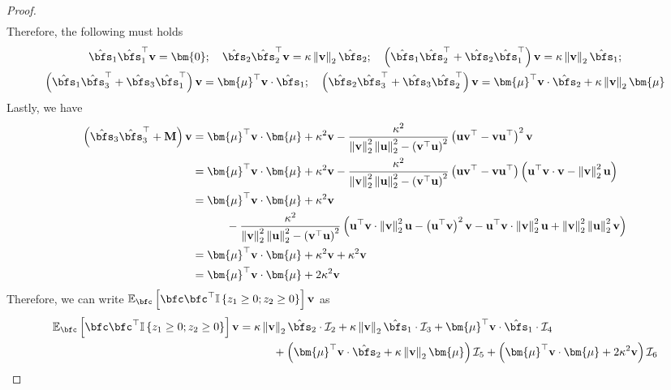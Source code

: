 \documentclass[10pt]{article} %
\theoremstyle{definition}
\theoremstyle{plain}
\newcommand{\paren}[1]{\left(#1\right)}
\newcommand{\norm}[1]{\left\|#1\right\|}
\newcommand{\indy}[1]{\mathbb{I}\left\{#1\right\}}
\providecommand{\E}{\mathbb{E}}
\def\bfM{{\mathbf{M}}}\def\bfN{{\mathbf{N}}}\def\bfO{{\mathbf{O}}}\def\bfP{{\mathbf{P}}}
\def\bfu{{\mathbf{u}}}\def\bfv{{\mathbf{v}}}\def\bfw{{\mathbf{w}}}\def\bfx{{\mathbf{x}}}
\begin{document}
\begin{proof}
\begin{align*}
    \end{align*}
    Therefore, the following must holds
    \begin{gather*}
        \hat{\bfs}_1\hat{\bfs}_1^\top\bfv = \bm{0};\quad \hat{\bfs}_2\hat{\bfs}_2^\top\bfv = \kappa\norm{\bfv}_2\hat{\bfs}_2;\quad \paren{\hat{\bfs}_1\hat{\bfs}_2^\top + \hat{\bfs}_2\hat{\bfs}_1^\top}\bfv = \kappa\norm{\bfv}_2\hat{\bfs}_1; \\
        \paren{\hat{\bfs}_1\hat{\bfs}_3^\top + \hat{\bfs}_3\hat{\bfs}_1^\top}\bfv = \bm{\mu}^\top\bfv\cdot \hat{\bfs}_1;\quad \paren{\hat{\bfs}_2\hat{\bfs}_3^\top + \hat{\bfs}_3\hat{\bfs}_2^\top}\bfv = \bm{\mu}^\top\bfv\cdot \hat{\bfs}_2 + \kappa\norm{\bfv}_2\bm{\mu}
    \end{gather*}
    Lastly, we have
    \begin{align*}
        \paren{\hat{\bfs}_3\hat{\bfs}_3^\top + \bfM}\bfv & = \bm{\mu}^\top\bfv \cdot \bm{\mu} + \kappa^2\bfv - \frac{\kappa^2}{\norm{\bfv}_2^2\norm{\bfu}_2^2 - \paren{\bfv^\top\bfu}^2}\paren{\bfu\bfv^\top-\bfv\bfu^\top}^2\bfv\\
        & = \bm{\mu}^\top\bfv \cdot \bm{\mu} + \kappa^2\bfv - \frac{\kappa^2}{\norm{\bfv}_2^2\norm{\bfu}_2^2 - \paren{\bfv^\top\bfu}^2}\paren{\bfu\bfv^\top -\bfv\bfu^\top}\paren{\bfu^\top\bfv\cdot\bfv - \norm{\bfv}_2^2\bfu}\\
        & = \bm{\mu}^\top\bfv \cdot \bm{\mu} + \kappa^2\bfv\\
        &\quad\quad\quad - \frac{\kappa^2}{\norm{\bfv}_2^2\norm{\bfu}_2^2 - \paren{\bfv^\top\bfu}^2}\paren{\bfu^\top\bfv\cdot \norm{\bfv}_2^2\bfu - \paren{\bfu^\top\bfv}^2\bfv - \bfu^\top\bfv\cdot\norm{\bfv}_2^2\bfu + \norm{\bfv}_2^2\norm{\bfu}_2^2\bfv}\\
        &=\bm{\mu}^\top\bfv \cdot \bm{\mu} + \kappa^2\bfv + \kappa^2\bfv\\
        & = \bm{\mu}^\top\bfv \cdot \bm{\mu} + 2\kappa^2\bfv
    \end{align*}
    Therefore, we can write $\E_{\bfc}\left[\bfc\bfc^\top\indy{z_1\geq 0;z_2\geq 0}\right]\bfv$ as
    \begin{equation}
        \label{eq:mat_exp_vec_prod_form1}
        \begin{aligned}
            \E_{\bfc}\left[\bfc\bfc^\top\indy{z_1\geq 0;z_2\geq 0}\right]\bfv & = \kappa\norm{\bfv}_2\hat{\bfs}_2\cdot\mathcal{I}_2 + \kappa\norm{\bfv}_2\hat{\bfs}_1\cdot\mathcal{I}_3 + \bm{\mu}^\top\bfv \cdot\hat{\bfs}_1\cdot \mathcal{I}_4\\
            &\quad\quad\quad + \paren{\bm{\mu}^\top\bfv\cdot \hat{\bfs}_2 + \kappa\norm{\bfv}_2\bm{\mu}}\mathcal{I}_5 + \paren{\bm{\mu}^\top\bfv \cdot \bm{\mu} + 2\kappa^2\bfv}\mathcal{I}_6\\

\end{aligned}
\end{equation}
\end{proof}
\end{document}
